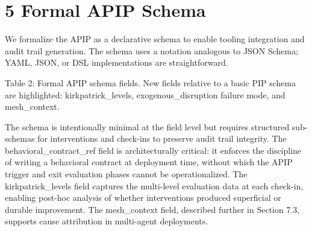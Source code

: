 \section{5  Formal APIP Schema}

We formalize the APIP as a declarative schema to enable tooling integration and audit trail generation. The schema uses a notation analogous to JSON Schema; YAML, JSON, or DSL implementations are straightforward.

Table 2: Formal APIP schema fields. New fields relative to a basic PIP schema are highlighted: kirkpatrick\_levels, exogenous\_disruption failure mode, and mesh\_context.

The schema is intentionally minimal at the field level but requires structured sub-schemas for interventions and check-ins to preserve audit trail integrity. The behavioral\_contract\_ref field is architecturally critical: it enforces the discipline of writing a behavioral contract at deployment time, without which the APIP trigger and exit evaluation phases cannot be operationalized. The kirkpatrick\_levels field captures the multi-level evaluation data at each check-in, enabling post-hoc analysis of whether interventions produced superficial or durable improvement. The mesh\_context field, described further in Section 7.3, supports cause attribution in multi-agent deployments.

